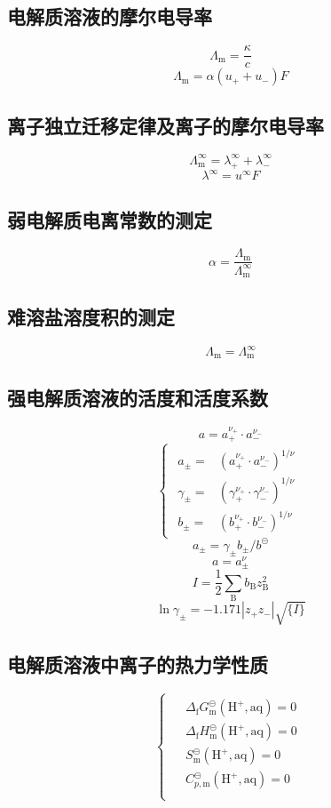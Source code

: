 \documentclass[twocolumn]{article}
\newcommand{\equ}[1]{\begin{equation*}#1\end{equation*}}
\newcommand{\dfgm}{\Delta_{\mathrm{f}}G_{\rmm}}
\newcommand{\dfhm}{\Delta_{\mathrm{f}}H_{\rmm}}
\newcommand{\nup}{\nu_{+}}
\newcommand{\num}{\nu_{-}}
\newcommand{\rmB}{\mathrm{B}}
\newcommand{\rmm}{\mathrm{m}}
\newcommand{\subB}{_{\rmB}}
\newcommand{\subm}{_{\rmm}}
\newcommand{\std}{^{\circleddash}}
\newcommand{\supinf}{^{\infty}}
\newcommand{\xkh}[1]{\left(#1\right)}
\begin{document}
\subsection{电解质溶液的摩尔电导率}
\equ{\Lambda\subm=\frac{\kappa}{c}}
\equ{\Lambda\subm=\alpha\xkh{u_{+}+u_{-}}F}
\subsection{离子独立迁移定律及离子的摩尔电导率}
\equ{\Lambda\subm\supinf=\lambda_{+}\supinf+\lambda_{-}\supinf}
\equ{\lambda\supinf=u\supinf F}
\subsection{弱电解质电离常数的测定}
\equ{\alpha=\frac{\Lambda\subm}{\Lambda\subm\supinf}}
\subsection{难溶盐溶度积的测定}
\equ{\Lambda\subm=\Lambda\subm\supinf}
\subsection{强电解质溶液的活度和活度系数}
\equ{a=a_{+}^{\nu_{+}}\cdot a_{-}^{\nu_{-}}}
\equ{\begin{cases}\begin{aligned}
a_{\pm}=&\xkh{a_{+}^{\nup}\cdot a_{-}^{\num}}^{1/\nu}\\
\gamma_{\pm}=&\xkh{\gamma_{+}^{\nup}\cdot \gamma_{-}^{\num}}^{1/\nu}\\
b_{\pm}=&\xkh{b_{+}^{\nup}\cdot b_{-}^{\num}}^{1/\nu}
\end{aligned}
\end{cases}}
\equ{a_{\pm}=\gamma_{\pm}b_{\pm}/b\std}
\equ{a=a^{\nu}_{\pm}}
\equ{I=\frac{1}{2}\sum\subB b\subB z\subB^{2}}
\equ{\ln \gamma_{\pm}=-1.171\left|z_{+}z_{-}\right|\sqrt{\{I\}}}
\subsection{电解质溶液中离子的热力学性质}
\equ{
\begin{cases}
\begin{aligned}
&\dfgm\std\xkh{\mathrm{H}^{+}, \mathrm{aq}}=0\\
&\dfhm\std\xkh{\mathrm{H}^{+}, \mathrm{aq}}=0\\
&S_{\rmm}\std\xkh{\mathrm{H}^{+}, \mathrm{aq}}=0\\
&C_{p, \rmm}\std\xkh{\mathrm{H}^{+}, \mathrm{aq}}=0\\
\end{aligned}
\end{cases}
}
\end{document}
